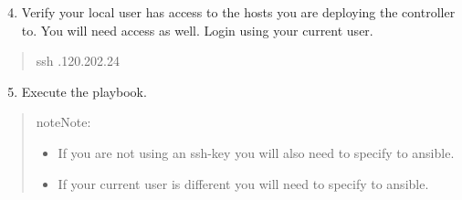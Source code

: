 \documentclass[letterpaper,10pt,english]{sphinxmanual}
\begin{document}
\begin{enumerate}
\setcounter{enumi}{3}
\item {} 
Verify your local user has access to the hosts you are deploying the controller to. You will need  access as well. Login using your current user.

\end{enumerate}
\begin{quote}

\begin{sphinxVerbatim}[commandchars=\\\{\}]
ssh .120.202.24
\end{sphinxVerbatim}
\end{quote}
\begin{enumerate}
\setcounter{enumi}{4}
\item {} 
Execute the playbook.

\end{enumerate}
\begin{quote}

\begin{sphinxadmonition}{note}{Note:}\begin{itemize}
\item {} 
If you are not using an ssh-key you will also need to specify  to ansible.

\item {} 
If your current user is different you will need to specify  to ansible.

\end{itemize}
\end{sphinxadmonition}

\begin{sphinxVerbatim}[commandchars=\\\{\}]
    
\end{sphinxVerbatim}
\end{quote}
\end{document}
